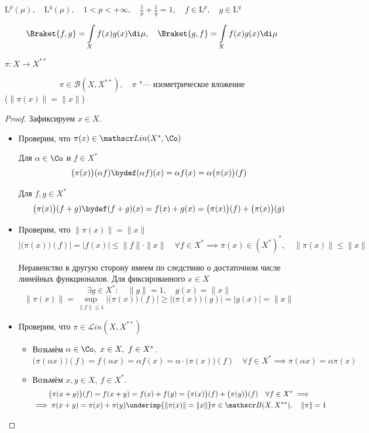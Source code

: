 \begin{eg}
	$ \mathrm L^p(\mu), \quad \mathrm L^q(\mu), \quad 1 < p < +\infty, \quad
	\frac1p + \frac1q = 1, \quad f \in \mathrm L^p, \quad g \in \mathrm L^q $

	$$ \Braket{f, g} = \int\limits_X f(x)g(x) \di \mu, \quad
	\Braket{g, f} = \int\limits_X f(x) g(x) \di \mu $$
\end{eg}

\begin{property}
	$ \pi : X \to X^{**} $

	$$ \pi \in \mathscr B(X, X^{**}), \quad \pi \text{ "--- изометрическое вложение} $$
	(\ie $ \|\pi(x)\| = \|x\| $)
\end{property}

\begin{proof}
	Зафиксируем $ x \in X $.
	\begin{itemize}
		\item Проверим, что $ \pi(x) \in \mathscr Lin(X^*, \Co) $

			Для $ \alpha \in \Co $ и $ f \in X^* $
			$$ \bigl( \pi(x) \bigr)(\alpha f) \bydef (\alpha f)(x) = \alpha f(x) =
			\alpha \bigl(\pi(x) \bigr)(f) $$

			Для $ f, g \in X^* $
			$$ \bigl(\pi(x) \bigr)(f + g) \bydef (f + g)(x) = f(x) + g(x) =
			\bigl(\pi(x) \bigr)(f) + \bigl(\pi(x) \bigr)(g) $$
		\item Проверим, что $ \|\pi(x)\| = \|x\| $
			$$ \bigl| \bigl( \pi(x) \bigr)(f) \bigr| =
			|f(x)| \le \|f\| \cdot \|x\| \quad \forall f \in X^* \implies
			\pi(x) \in (X^*)^*, \quad \|\pi(x)\| \le \|x\| $$

			Неравенство в другую сторону имеем по следствию о достаточном числе линейных
			функционалов.
			Для фиксированного $ x \in X $
			$$ \exists g \in X^* : \quad \|g\| = 1, \quad g(x) = \|x\| $$
			$$ \|\pi(x)\| =
			\sup\limits_{\|f\| \le 1} \bigl| \bigl(\pi(x)\bigr)(f) \bigr| \ge
			\bigl| \bigl(\pi(x)\bigr)(g)\bigr| = |g(x)| = \|x\| $$
		\item Проверим, что $ \pi \in \mathscr Lin(X, X^{**}) $
			\begin{itemize}
				\item Возьмём $ \alpha \in \Co, ~ x \in X, ~ f \in X^* $.
					$$ \bigl(\pi(\alpha x) \bigr)(f) = f(\alpha x) = \alpha f(x) =
					\alpha \cdot \bigl(\pi(x)\bigr)(f) \quad \forall f \in X^* \implies
					\pi(\alpha x) = \alpha \pi(x) $$

				\item Возьмём $ x, y \in X, ~ f \in X^* $.
					\begin{multline*}
						\bigl(\pi(x + y)\bigr)(f) = f(x + y) = f(x) + f(y) =
						\bigl(\pi(x)\bigr)(f) + \bigl(\pi(y)\bigr)(f) \quad
						\forall f \in X^* \implies \\
						\implies \pi(x + y) = \pi(x) + \pi(y) \underimp{\|\pi(x)\| = \|x\|}
						\pi \in \mathscr B(X, X^{**}), \quad \|\pi\| = 1
					\end{multline*}
			\end{itemize}
	\end{itemize}
\end{proof}


